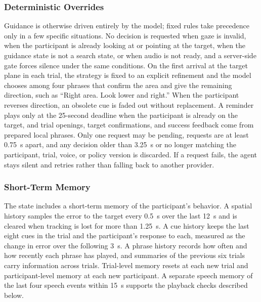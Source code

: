 \subsubsection{Deterministic Overrides}
\label{sec:overrides}
Guidance is otherwise driven entirely by the model; fixed rules take precedence only in a few specific situations. No decision is requested when gaze is invalid, when the participant is already looking at or pointing at the target, when the guidance state is not a search state, or when audio is not ready, and a server-side gate forces silence under the same conditions. On the first arrival at the target plane in each trial, the strategy is fixed to an explicit refinement and the model chooses among four phrases that confirm the area and give the remaining direction, such as ``Right area. Look lower and right.'' When the participant reverses direction, an obsolete cue is faded out without replacement. A reminder plays only at the 25-second deadline when the participant is already on the target, and trial openings, target confirmations, and success feedback come from prepared local phrases. Only one request may be pending, requests are at least 0.75~s apart, and any decision older than 3.25~s or no longer matching the participant, trial, voice, or policy version is discarded. If a request fails, the agent stays silent and retries rather than falling back to another provider.

\subsubsection{Short-Term Memory}
The state includes a short-term memory of the participant's behavior. A spatial history samples the error to the target every 0.5~s over the last 12~s and is cleared when tracking is lost for more than 1.25~s. A cue history keeps the last eight cues in the trial and the participant's response to each, measured as the change in error over the following 3~s. A phrase history records how often and how recently each phrase has played, and summaries of the previous six trials carry information across trials. Trial-level memory resets at each new trial and participant-level memory at each new participant. A separate speech memory of the last four speech events within 15~s supports the playback checks described below.

